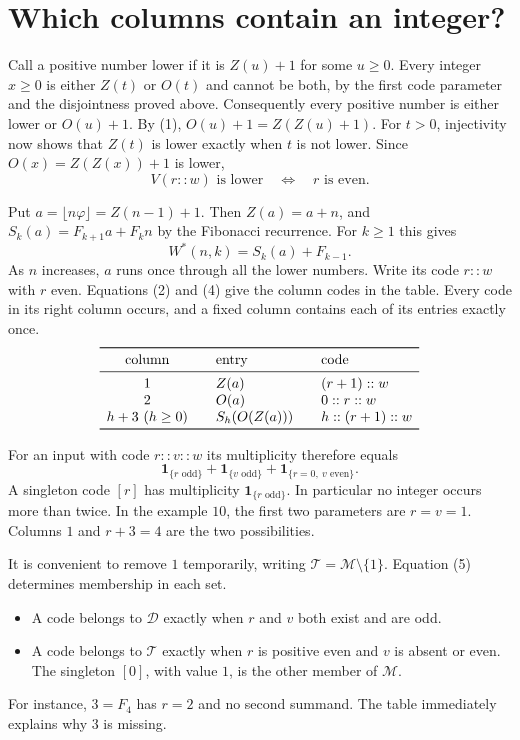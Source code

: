 \documentclass[11pt]{article}
\newcommand{\D}{\mathcal D}
\newcommand{\M}{\mathcal M}
\newcommand{\T}{\mathcal T}
\newcommand{\ph}{\varphi}
\newcommand{\ind}[1]{\mathbf 1_{\{#1\}}}
\begin{document}
\newpage
\section{Which columns contain an integer?}\label{sec:positions}
Call a positive number lower if it is $Z(u)+1$ for some $u\ge0$. Every
integer $x\ge0$ is either $Z(t)$ or $O(t)$ and cannot be both, by the first
code parameter and the disjointness proved above. Consequently every
positive number is either lower or $O(u)+1$. By (1),
$O(u)+1=Z(Z(u)+1)$. For $t>0$, injectivity now shows that $Z(t)$ is lower
exactly when $t$ is not lower. Since $O(x)=Z(Z(x))+1$ is lower,
\[
             V(r::w)\text{ is lower}\quad\Longleftrightarrow\quad r\text{ is even}. \tag{3}
\]

Put $a=\lfloor n\ph\rfloor=Z(n-1)+1$. Then $Z(a)=a+n$, and
$S_k(a)=F_{k+1}a+F_kn$ by the Fibonacci recurrence. For $k\ge1$ this gives
\[
                       W^*(n,k)=S_k(a)+F_{k-1}.             \tag{4}
\]
As $n$ increases, $a$ runs once through all the lower numbers. Write its
code $r::w$ with $r$ even. Equations (2) and (4) give the column codes in the table.
Every code in its right column occurs, and a fixed column contains each
of its entries exactly once.
\[
\begin{array}{c@{\qquad}l@{\qquad}l}
\toprule
\text{column} & \text{entry} & \text{code}\\ \midrule
1 & Z(a) & (r+1)::w\\
2 & O(a) & 0::r::w\\
h+3\ (h\ge0)& S_h(O(Z(a))) & h::(r+1)::w\\ \bottomrule
\end{array}
\]

For an input with code $r::v::w$ its multiplicity therefore equals
\[
  \ind{r\text{ odd}}+\ind{v\text{ odd}}+\ind{r=0,\ v\text{ even}}.   \tag{5}
\]
A singleton code $[r]$ has multiplicity $\ind{r\text{ odd}}$.
In particular no integer occurs more than twice. In the example $10$,
the first two parameters are $r=v=1$. Columns $1$ and $r+3=4$ are
the two possibilities.

It is convenient to remove $1$ temporarily, writing $\T=\M\setminus\{1\}$.
Equation (5) determines membership in each set.
\begin{itemize}
\item A code belongs to $\D$ exactly when $r$ and $v$ both exist and are odd.
\item A code belongs to $\T$ exactly when $r$ is positive even and
$v$ is absent or even. The singleton $[0]$, with value $1$, is the other
member of $\M$.
\end{itemize}
For instance, $3=F_4$ has $r=2$ and no second summand. The table immediately
explains why $3$ is missing.
\end{document}
